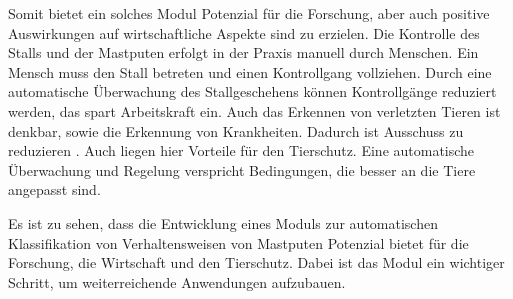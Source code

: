 
Somit bietet ein solches Modul Potenzial für die Forschung, aber auch positive Auswirkungen auf wirtschaftliche Aspekte sind zu erzielen. Die Kontrolle des Stalls und der Mastputen erfolgt in der Praxis manuell durch Menschen. Ein Mensch muss den Stall betreten und einen Kontrollgang vollziehen. Durch eine automatische Überwachung des Stallgeschehens können Kontrollgänge reduziert werden, das spart Arbeitskraft ein. Auch das Erkennen von verletzten Tieren ist denkbar, sowie die Erkennung von Krankheiten. Dadurch ist Ausschuss zu reduzieren \cite{Chen.2023, Garcia.2020}. Auch liegen hier Vorteile für den Tierschutz. Eine automatische Überwachung und Regelung verspricht Bedingungen, die besser an die Tiere angepasst sind.\par

Es ist zu sehen, dass die Entwicklung eines Moduls zur automatischen Klassifikation von Verhaltensweisen von Mastputen Potenzial bietet für die Forschung, die Wirtschaft und den Tierschutz. Dabei ist das Modul ein wichtiger Schritt, um weiterreichende Anwendungen aufzubauen. 
